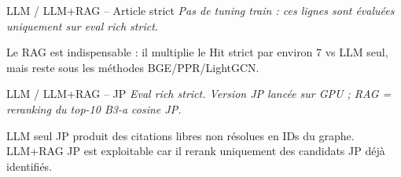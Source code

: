 \documentclass[aspectratio=169,10pt]{beamer}
\newcommand{\keybox}[1]{%
  \begin{center}
  \colorbox{accentsoft}{\parbox{0.92\linewidth}{\centering #1}}
  \end{center}}
\begin{document}
\begin{frame}{LLM / LLM+RAG -- Article strict}
  \scriptsize
  \textit{Pas de tuning train : ces lignes sont évaluées uniquement sur eval rich strict.}

  \vspace{0.35em}
  \begin{center}
  \renewcommand{\arraystretch}{1.12}
  \setlength{\tabcolsep}{4pt}
  \end{center}

  \vspace{0.5em}
  \keybox{\scriptsize Le RAG est indispensable : il multiplie le Hit strict par
  environ 7 vs LLM seul, mais reste sous les méthodes BGE/PPR/LightGCN.}
\end{frame}

\begin{frame}{LLM / LLM+RAG -- JP}
  \scriptsize
  \textit{Eval rich strict. Version JP lancée sur GPU ; RAG = reranking du top-10 B3-a cosine JP.}

  \vspace{0.35em}
  \begin{center}
  \renewcommand{\arraystretch}{1.12}
  \setlength{\tabcolsep}{4pt}
  \end{center}

  \vspace{0.5em}
  \keybox{\scriptsize LLM seul JP produit des citations libres non résolues en
  IDs du graphe. LLM+RAG JP est exploitable car il rerank uniquement des candidats
  JP déjà identifiés.}
\end{frame}
\end{document}

